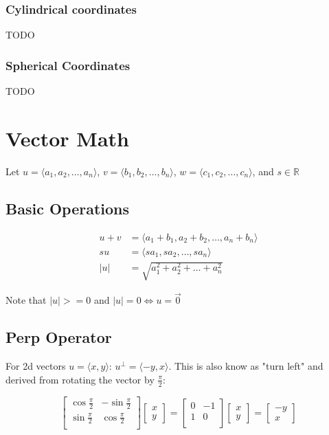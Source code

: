 \documentclass[12pt]{report}
\begin{document}
\subsubsection{Cylindrical coordinates}
TODO
\subsubsection{Spherical Coordinates}
TODO
\section{Vector Math}
Let $u = \langle a_1, a_2, \dots, a_n \rangle$, $v = \langle b_1,b_2, \dots, b_n \rangle$, $w = \langle c_1, c_2, \dots, c_n \rangle$, and $s \in \mathbb{R}$
\subsection{Basic Operations}
\begin{align*}
u + v &= \langle a_1 + b_1, a_2 + b_2, \dots, a_n + b_n \rangle \\
su &= \langle sa_1, sa_2, \dots, sa_n \rangle \\
|u| &= \sqrt{a_1^2 + a_2^2 + \dots + a_n^2}
\end{align*}

Note that $|u| >= 0$ and $|u| = 0 \Leftrightarrow u = \vec{0}$

\subsection{Perp Operator}
For 2d vectors $u = \langle x, y \rangle$:
$u^\perp = \langle -y, x \rangle$. This is also know as "turn left" and derived from rotating the vector by $\frac{\pi}{2}$:

$$
\begin{bmatrix}
\cos\frac{\pi}{2} & -\sin\frac{\pi}{2}\\
\sin\frac{\pi}{2} & \cos\frac{\pi}{2}\\
\end{bmatrix}\begin{bmatrix}
x\\
y
\end{bmatrix} = 
\begin{bmatrix}
0 & -1\\
1 & 0\\
\end{bmatrix}\begin{bmatrix}
x\\
y
\end{bmatrix} =
\begin{bmatrix}
-y\\
x
\end{bmatrix}
$$
\end{document}
